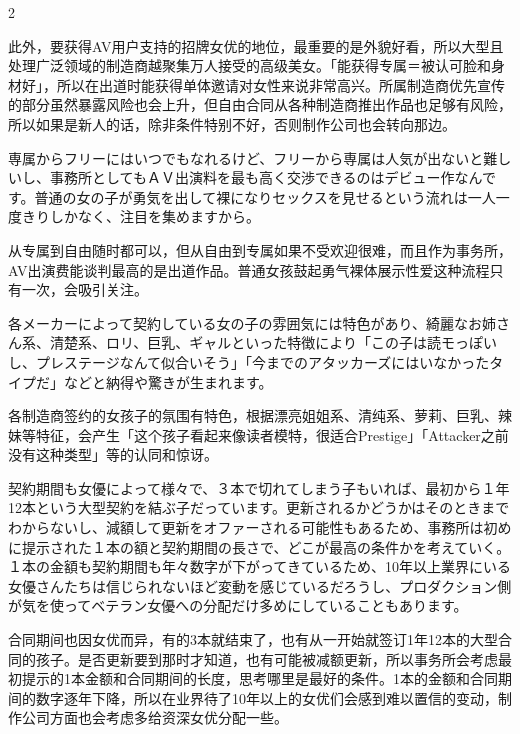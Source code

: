 \documentclass[12pt,UTF8]{ctexbook}
\begin{document}
\begin{paracol}{2}
\switchcolumn

此外，要获得AV用户支持的招牌女优的地位，最重要的是外貌好看，所以大型且处理广泛领域的制造商越聚集万人接受的高级美女。「能获得专属＝被认可脸和身材好」，所以在出道时能获得单体邀请对女性来说非常高兴。所属制造商优先宣传的部分虽然暴露风险也会上升，但自由合同从各种制造商推出作品也足够有风险，所以如果是新人的话，除非条件特别不好，否则制作公司也会转向那边。

\switchcolumn*

専属からフリーにはいつでもなれるけど、フリーから専属は人気が出ないと難しいし、事務所としてもＡＶ出演料を最も高く交渉できるのはデビュー作なんです。普通の女の子が勇気を出して裸になりセックスを見せるという流れは一人一度きりしかなく、注目を集めますから。

\switchcolumn

从专属到自由随时都可以，但从自由到专属如果不受欢迎很难，而且作为事务所，AV出演费能谈判最高的是出道作品。普通女孩鼓起勇气裸体展示性爱这种流程只有一次，会吸引关注。

\switchcolumn*

各メーカーによって契約している女の子の雰囲気には特色があり、綺麗なお姉さん系、清楚系、ロリ、巨乳、ギャルといった特徴により「この子は読モっぽいし、プレステージなんて似合いそう」「今までのアタッカーズにはいなかったタイプだ」などと納得や驚きが生まれます。

\switchcolumn

各制造商签约的女孩子的氛围有特色，根据漂亮姐姐系、清纯系、萝莉、巨乳、辣妹等特征，会产生「这个孩子看起来像读者模特，很适合Prestige」「Attacker之前没有这种类型」等的认同和惊讶。

\switchcolumn*

契約期間も女優によって様々で、３本で切れてしまう子もいれば、最初から１年12本という大型契約を結ぶ子だっています。更新されるかどうかはそのときまでわからないし、減額して更新をオファーされる可能性もあるため、事務所は初めに提示された１本の額と契約期間の長さで、どこが最高の条件かを考えていく。１本の金額も契約期間も年々数字が下がってきているため、10年以上業界にいる女優さんたちは信じられないほど変動を感じているだろうし、プロダクション側が気を使ってベテラン女優への分配だけ多めにしていることもあります。

\switchcolumn

合同期间也因女优而异，有的3本就结束了，也有从一开始就签订1年12本的大型合同的孩子。是否更新要到那时才知道，也有可能被减额更新，所以事务所会考虑最初提示的1本金额和合同期间的长度，思考哪里是最好的条件。1本的金额和合同期间的数字逐年下降，所以在业界待了10年以上的女优们会感到难以置信的变动，制作公司方面也会考虑多给资深女优分配一些。


\end{paracol}
\end{document}
